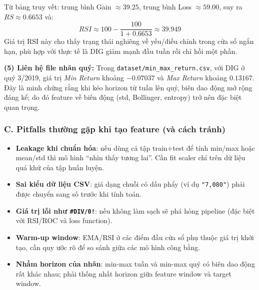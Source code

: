 \documentclass[12pt,a4paper]{article}
\begin{document}
Từ bảng truy vết: trung bình Gain $\approx 39.25$, trung bình Loss $\approx 59.00$, suy ra $RS\approx0.6653$ và:
\begin{equation}
RSI \approx 100-\frac{100}{1+0.6653}\approx 39.949
\end{equation}
Giá trị RSI này cho thấy trạng thái nghiêng về yếu/điều chỉnh trong cửa sổ ngắn hạn, phù hợp với thực tế là DIG giảm mạnh đầu tuần rồi chỉ hồi một phần.

\textbf{(5) Liên hệ file nhãn quý:}
Trong \texttt{dataset/min\_max\_return.csv}, với DIG ở quý 3/2019, giá trị \textit{Min Return} khoảng $-0.07037$ và \textit{Max Return} khoảng $0.13167$. Đây là minh chứng rằng khi kéo horizon từ tuần lên quý, biên dao động mở rộng đáng kể; do đó feature về biến động (std, Bollinger, entropy) trở nên đặc biệt quan trọng.

\subsubsection*{C. Pitfalls thường gặp khi tạo feature (và cách tránh)}
\begin{itemize}[leftmargin=1.5em]
  \item \textbf{Leakage khi chuẩn hóa}: nếu dùng cả tập train+test để tính min/max hoặc mean/std thì mô hình “nhìn thấy tương lai”. Cần fit scaler chỉ trên dữ liệu quá khứ của tập huấn luyện.
  \item \textbf{Sai kiểu dữ liệu CSV}: giá dạng chuỗi có dấu phẩy (ví dụ \texttt{"7,080"}) phải được chuyển sang số trước khi tính toán.
  \item \textbf{Giá trị lỗi như \texttt{\#DIV/0!}}: nếu không làm sạch sẽ phá hỏng pipeline (đặc biệt với RSI/ROC và loss function).
  \item \textbf{Warm-up window}: EMA/RSI ở các điểm đầu cửa sổ phụ thuộc giá trị khởi tạo, cần quy ước rõ để so sánh giữa các mô hình công bằng.
  \item \textbf{Nhầm horizon của nhãn}: min-max tuần và min-max quý có biên dao động rất khác nhau; phải thống nhất horizon giữa feature window và target window.
\end{itemize}
\end{document}
